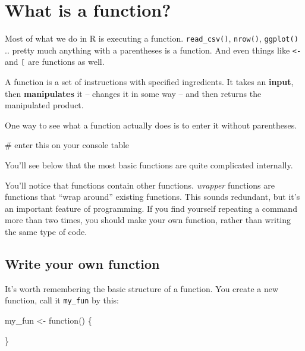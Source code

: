 \documentclass[
  letterpaper,
]{book}
\newenvironment{Shaded}{\begin{snugshade}}{\end{snugshade}}
\newcommand{\CommentTok}[1]{\textcolor[rgb]{0.37,0.37,0.37}{#1}}
\newcommand{\ControlFlowTok}[1]{\textcolor[rgb]{0.00,0.23,0.31}{#1}}
\newcommand{\NormalTok}[1]{\textcolor[rgb]{0.00,0.23,0.31}{#1}}
\newcommand{\OtherTok}[1]{\textcolor[rgb]{0.00,0.23,0.31}{#1}}
\theoremstyle{definition}
\theoremstyle{definition}
\theoremstyle{plain}
\theoremstyle{definition}
\theoremstyle{plain}
\theoremstyle{plain}
\theoremstyle{remark}
\begin{document}
\hypertarget{what-is-a-function}{%
\section{What is a function?}\label{what-is-a-function}}

Most of what we do in R is executing a function. \texttt{read\_csv()},
\texttt{nrow()}, \texttt{ggplot()} .. pretty much anything with a
parentheses is a function. And even things like \texttt{\textless{}-}
and \texttt{{[}} are functions as well.

A function is a set of instructions with specified ingredients. It takes
an \textbf{input}, then \textbf{manipulates} it -- changes it in some
way -- and then returns the manipulated product.

One way to see what a function actually does is to enter it without
parentheses.

\begin{Shaded}
\begin{Highlighting}[]
\CommentTok{\# enter this on your console}
\NormalTok{table}
\end{Highlighting}
\end{Shaded}

You'll see below that the most basic functions are quite complicated
internally.

You'll notice that functions contain other functions. \emph{wrapper}
functions are functions that ``wrap around'' existing functions. This
sounds redundant, but it's an important feature of programming. If you
find yourself repeating a command more than two times, you should make
your own function, rather than writing the same type of code.

\hypertarget{write-your-own-function}{%
\subsection{Write your own function}\label{write-your-own-function}}

It's worth remembering the basic structure of a function. You create a
new function, call it \texttt{my\_fun} by this:

\begin{Shaded}
\begin{Highlighting}[]
\NormalTok{my\_fun }\OtherTok{\textless{}{-}} \ControlFlowTok{function}\NormalTok{() \{}
  
\NormalTok{\}}
\end{Highlighting}
\end{Shaded}
\end{document}
